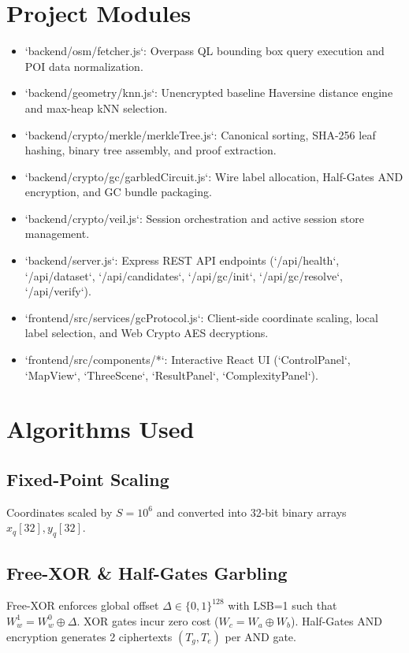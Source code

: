 \documentclass[12pt,a4paper,oneside]{report}
\begin{document}
\section{Project Modules}
\begin{itemize}
    \item `backend/osm/fetcher.js`: Overpass QL bounding box query execution and POI data normalization.
    \item `backend/geometry/knn.js`: Unencrypted baseline Haversine distance engine and max-heap kNN selection.
    \item `backend/crypto/merkle/merkleTree.js`: Canonical sorting, SHA-256 leaf hashing, binary tree assembly, and proof extraction.
    \item `backend/crypto/gc/garbledCircuit.js`: Wire label allocation, Half-Gates AND encryption, and GC bundle packaging.
    \item `backend/crypto/veil.js`: Session orchestration and active session store management.
    \item `backend/server.js`: Express REST API endpoints (`/api/health`, `/api/dataset`, `/api/candidates`, `/api/gc/init`, `/api/gc/resolve`, `/api/verify`).
    \item `frontend/src/services/gcProtocol.js`: Client-side coordinate scaling, local label selection, and Web Crypto AES decryptions.
    \item `frontend/src/components/*`: Interactive React UI (`ControlPanel`, `MapView`, `ThreeScene`, `ResultPanel`, `ComplexityPanel`).
\end{itemize}

\section{Algorithms Used}
\subsection{Fixed-Point Scaling}
Coordinates scaled by $S=10^6$ and converted into 32-bit binary arrays $x_q[32], y_q[32]$.

\subsection{Free-XOR & Half-Gates Garbling}
Free-XOR enforces global offset $\Delta \in \{0,1\}^{128}$ with LSB=1 such that $W_w^1 = W_w^0 \oplus \Delta$. XOR gates incur zero cost ($W_c = W_a \oplus W_b$). Half-Gates AND encryption generates 2 ciphertexts $(T_g, T_e)$ per AND gate.
\end{document}
